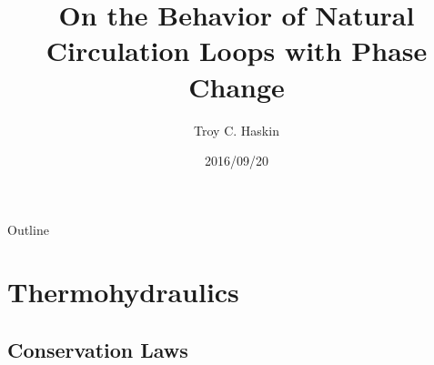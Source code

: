 \documentclass[10pt,t,xcolor=table,compress]{UWMadBeamer}
\title{On the Behavior of Natural Circulation Loops with Phase Change}
\institute{University of Wisconsin--Madison}
\author{Troy C. Haskin}
\date{2016/09/20}
\begin{document}
\begin{frame}
    \titlepage
\end{frame}


\begin{frame}{Outline}
    \tableofcontents
\end{frame}








   
\section{Thermohydraulics}

    \subsection*{Conservation Laws}
\end{document}
